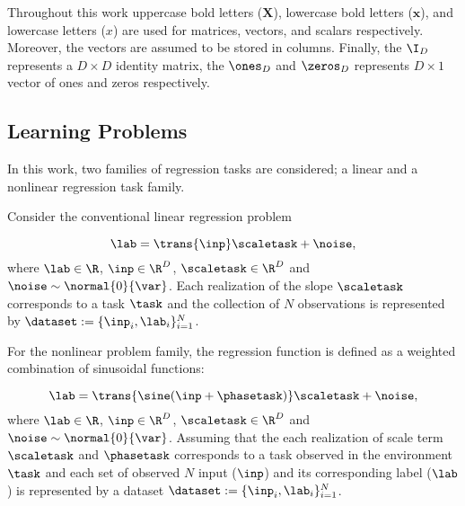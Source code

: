 Throughout this work uppercase bold letters (\eg $\mathbf{X}$), lowercase bold letters (\eg $\mathbf{x}$), and lowercase letters (\eg ${x}$) are used for matrices, vectors, and scalars respectively. Moreover, the vectors are assumed to be stored in columns. Finally, the $\I_{D}$ represents a $D\times D$ identity matrix, the $\ones_{D}$ and $\zeros_{D}$ represents $D\times 1$ vector of ones and zeros respectively.

\subsection{Learning Problems}

In this work, two families of regression tasks are considered; a linear and a nonlinear regression task family.


Consider the conventional linear regression problem

\begin{equation}\label{eq:linearreg}
  \lab = \trans{\inp}\scaletask+\noise, 
\end{equation}
where $\lab\in\R$, $\inp\in\R^D$, $\scaletask\in\R^D$ and $\noise\sim\normal{0}{\var}$. Each realization of the slope $\scaletask$ corresponds to a task $\task$ and the collection of $N$ observations is represented by $\dataset:=\{\inp_i, \lab_i\}_{i=1}^{N}$. 

For the nonlinear problem family, the regression function is defined as a weighted combination of sinusoidal functions:

\begin{equation}\label{eq:nonlinearreg}
  \lab = \trans{\sine(\inp+\phasetask)}\scaletask+\noise, 
\end{equation}
where $\lab\in\R$, $\inp\in\R^D$, $\scaletask\in\R^D$ and $\noise\sim\normal{0}{\var}$. Assuming that the each realization of scale term $\scaletask$ and $\phasetask$ corresponds to a task observed in the environment $\task$ and each set of observed $N$ input ($\inp$) and its corresponding label ($\lab$) is represented by a dataset $\dataset:=\{\inp_i, \lab_i\}_{i=1}^{N}$.

